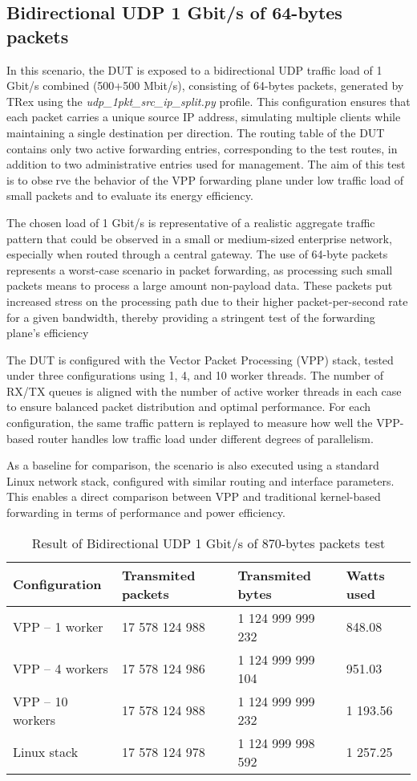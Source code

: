 \subsection{Bidirectional UDP 1 Gbit/s of 64-bytes packets}
In this scenario, the DUT is exposed to a bidirectional UDP traffic load of 1\,Gbit/s combined (500+500 Mbit/s), 
consisting of 64-bytes packets, generated by TRex using the \textit{udp\_1pkt\_src\_ip\_split.py} profile. 
This configuration ensures that each packet carries a unique source IP address, simulating multiple clients while maintaining a single destination per direction. 
The routing table of the DUT contains only two active forwarding entries, corresponding to the test routes, in addition to two administrative entries used for management. 
The aim of this test is to observe the behavior of the VPP forwarding plane under low traffic load of small packets and to evaluate its energy efficiency.

The chosen load of 1 Gbit/s is representative of a realistic aggregate traffic pattern that could be observed in a small or medium-sized enterprise network, especially when routed through a central gateway.
The use of 64-byte packets represents a worst-case scenario in packet forwarding, as processing such small packets means to process a large amount non-payload data. 
These packets put increased stress on the processing path due to their higher packet-per-second rate for a given bandwidth, thereby providing a stringent test of the forwarding plane's efficiency

The DUT is configured with the Vector Packet Processing (VPP) stack, tested under three configurations using 1, 4, and 10 worker threads. 
The number of RX/TX queues is aligned with the number of active worker threads in each case to ensure balanced packet distribution and optimal performance. 
For each configuration, the same traffic pattern is replayed to measure how well the VPP-based router handles low traffic load under different degrees of parallelism.

As a baseline for comparison, the scenario is also executed using a standard Linux network stack, configured with similar routing and interface parameters. 
This enables a direct comparison between VPP and traditional kernel-based forwarding in terms of performance and power efficiency.

\begin{table}[h!]
\centering
\begin{tabular}{|l|l|l|l|}
\hline
\textbf{Configuration} & \textbf{Transmited packets} & \textbf{Transmited bytes} & \textbf{Watts used} \\
\hline
VPP -- 1 worker & 17 578 124 988 & 1 124 999 999 232 & 848.08 \\
VPP -- 4 workers & 17 578 124 986 & 1 124 999 999 104 & 951.03 \\
VPP -- 10 workers &  17 578 124 988 & 1 124 999 999 232 & 1 193.56 \\
Linux stack & 17 578 124 978 & 1 124 999 998 592 & 1 257.25 \\
\hline
\end{tabular}
\caption{Result of Bidirectional UDP 1 Gbit/s of 870-bytes packets test}
\label{tab:udp:one}
\end{table}

